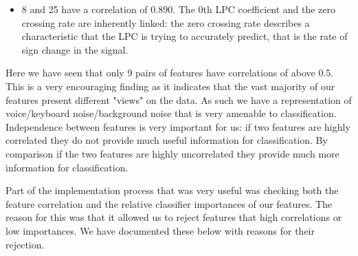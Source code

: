 \documentclass[ %
                    author={Sam Phippen},
                supervisor={Dr. Rafal Bogacz},
                     title={Real time voice activity detectors in noisy personal computing environments},
                  subtitle={},
                    degree={MEng},
                      year={2012} ]{thesis}
\begin{document}
\begin{itemize}
    \item 8 and 25 have a correlation of 0.890. The 0th LPC coefficient and the
        zero crossing rate are inherently linked: the zero crossing rate
        describes a characteristic that the LPC is trying to accurately
        predict, that is the rate of sign change in the signal.

\end{itemize}

Here we have seen that only 9 pairs of features have correlations of above 0.5.
This is a very encouraging finding as it indicates that the vast majority of
our features present different "views" on the data. As such we have a
representation of voice/keyboard noise/background noise that is very amenable
to classification. Independence between features is very important for us: if
two features are highly correlated they do not provide much useful information
for classification. By comparison if the two features are highly uncorrelated
they provide much more information for classification.

Part of the implementation process that was very useful was checking both the
feature correlation and the relative classifier importances of our features.
The reason for this was that it allowed us to reject features that high
correlations or low importances. We have documented these below with reasons
for their rejection.
\end{document}
